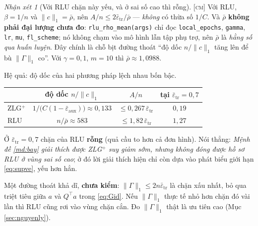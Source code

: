 \documentclass[11pt,a4paper]{article}
\theoremstyle{remark}
\newtheorem{nhanxet}[dinhly]{Nhận xét}
\newcommand{\epstr}{\bar\varepsilon_{\mathrm{tr}}}
\newcommand{\epsaux}{\bar\varepsilon_{\mathrm{aux}}}
\newcommand{\code}[1]{\texttt{\small #1}}
\begin{document}
\begin{nhanxet}[Với RLU chặn này yếu, và ở sai số cao thì rỗng]
\label{nx:rluyeu}
\textsc{[cm]}\; Với RLU, $\beta=1/n$ và $\|c\|_1=\bar\rho$, nên
$A/n\le2\epstr/\bar\rho$ --- \emph{không} có thừa số $1/C$. Và $\bar\rho$
\textbf{không phải đại lượng chưa đo}: \code{rlu\_rho\_mean(args)} chỉ đọc
\code{local\_epochs}, \code{gamma}, \code{lr}, \code{mu}, \code{fl\_scheme};
nó không chạm vào mô hình lẫn tập phụ trợ, nên $\bar\rho$ là \emph{hằng số
qua huấn luyện}. Đây chính là chỗ bịt đường thoát ``độ dốc $n/\|c\|_1$ tăng
lên để bù $\|\Gamma\|_1$ co''. Với $\gamma=0{,}1$, $m=10$ thì
$\bar\rho\approx1{,}0988$.

Hệ quả: độ dốc của hai phương pháp lệch nhau bốn bậc.

\begin{center}
\begin{tabular}{@{}lccc@{}}
\toprule
 & độ dốc $n/\|c\|_1$ & $A/n$ & tại $\epstr=0{,}7$ \\
\midrule
ZLG$^+$ & $1/\bigl(C(1-\epsaux)\bigr)\approx0{,}133$ & $\le0{,}267\,\epstr$ & $0{,}19$ \\
RLU     & $n/\bar\rho\approx583$ & $\le1{,}82\,\epstr$ & $1{,}27$ \\
\bottomrule
\end{tabular}
\end{center}

Ở $\epstr=0{,}7$ chặn của RLU \textbf{rỗng} (quả cầu to hơn cả đơn hình).
Nói thẳng: \emph{Mệnh đề \ref{md:bay} giải thích được ZLG$^+$ suy giảm sớm,
nhưng không đóng được hồ sơ RLU ở vùng sai số cao}; ở đó lời giải thích hiện
chỉ còn dựa vào phát biểu giới hạn \eqref{eq:supve}, yếu hơn hẳn.

Một đường thoát khả dĩ, \textbf{chưa kiểm}: $\|\Gamma\|_1\le2n\epstr$ là chặn
xấu nhất, bỏ qua triệt tiêu giữa $a$ và $Q^{\!\top}a$ trong \eqref{eq:Gid}.
Nếu $\|\Gamma\|_1$ thực tế nhỏ hơn chặn đó vài lần thì RLU cũng rơi vào vùng
chặn cắn. Đo $\|\Gamma\|_1$ thật là ưu tiên cao (Mục \ref{sec:nguyenly}).
\end{nhanxet}
\end{document}
